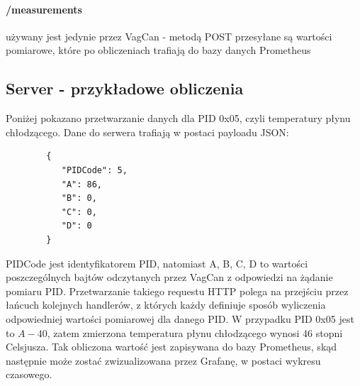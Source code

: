 \documentclass[10pt,a4paper]{article}
\begin{document}
		\paragraph{\slash measurements} używany jest jedynie przez VagCan - metodą POST przesyłane są wartości pomiarowe, które po obliczeniach trafiają do bazy danych Prometheus
		\subsection{Server - przykładowe obliczenia}
		Poniżej pokazano przetwarzanie danych dla PID 0x05, czyli temperatury płynu chłodzącego.
		Dane do serwera trafiają w postaci payloadu JSON:\\
		\begin{lstlisting}
		{
		   "PIDCode": 5,
		   "A": 86,
		   "B": 0,
		   "C": 0,
		   "D": 0
		}
		\end{lstlisting}
		PIDCode jest identyfikatorem PID, natomiast A, B, C, D to wartości poszczególnych bajtów odczytanych przez VagCan z odpowiedzi na żądanie pomiaru PID. Przetwarzanie takiego requestu HTTP polega na przejściu przez łańcuch kolejnych handlerów, z których każdy definiuje sposób wyliczenia odpowiedniej wartości pomiarowej dla danego PID. W przypadku PID 0x05 jest to
		$ A-40 $, zatem zmierzona temperatura płynu chłodzącego wynosi 46 stopni Celsjusza. Tak obliczona wartość jest zapisywana do bazy Prometheus, skąd następnie może zostać zwizualizowana przez Grafanę, w postaci wykresu czasowego.
\end{document}
